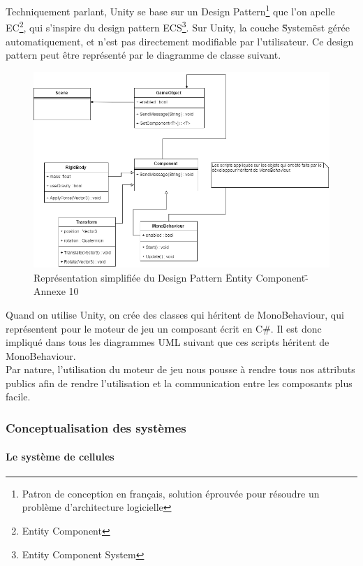 \documentclass[a4paper]{article}
\begin{document}
    Techniquement parlant, Unity se base sur un Design Pattern\footnote{Patron de conception en français, solution éprouvée pour résoudre un problème d'architecture logicielle} que l'on apelle EC\footnote{Entity Component}, qui s'inspire du design pattern ECS\footnote{Entity Component System}. Sur Unity, la couche \"System\" est gérée automatiquement, et n'est pas directement modifiable par l'utilisateur. Ce design pattern peut être représenté par le diagramme de classe suivant. \\

    \begin{figure}[H]
        \centering
        \includegraphics[scale=0.45]{img/DiagClasseEntityComponent}
        \caption{Représentation simplifiée du Design Pattern \"Entity Component\" - Annexe 10}
    \end{figure} 

    Quand on utilise Unity, on crée des classes qui héritent de MonoBehaviour, qui représentent pour le moteur de jeu un composant écrit en C\#. Il est donc impliqué dans tous les diagrammes UML suivant que ces scripts héritent de MonoBehaviour. \\

    Par nature, l'utilisation du moteur de jeu nous pousse à rendre tous nos attributs publics afin de rendre l'utilisation et la communication entre les composants plus facile. \\

    \subsubsection{Conceptualisation des systèmes}

    \paragraph{Le système de cellules}
\end{document}
